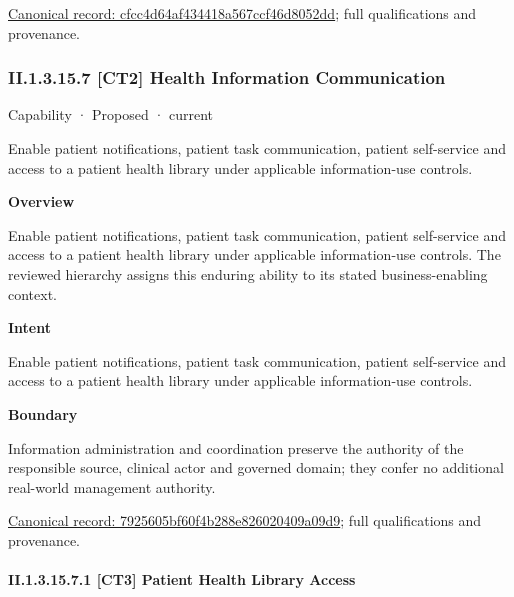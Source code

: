 {\footnotesize \href{../../../../continuum/strategy/capability/feature/cfcc4d64af434418a567ccf46d8052dd.md}{Canonical record: cfcc4d64af434418a567ccf46d8052dd}; full qualifications and provenance.}\par
\subsubsection*{II.1.3.15.7 [CT2] Health Information Communication}
\label{navigation:II.1.3.15.7}

\label{element:7925605bf60f4b288e826020409a09d9}
{\small Capability · Proposed · current}\par

Enable patient notifications, patient task communication, patient self-service and access to a patient health library under applicable information-use controls.



\textbf{Overview}



Enable patient notifications, patient task communication, patient self-service and access to a patient health library under applicable information-use controls. The reviewed hierarchy assigns this enduring ability to its stated business-enabling context.



\textbf{Intent}



Enable patient notifications, patient task communication, patient self-service and access to a patient health library under applicable information-use controls.



\textbf{Boundary}



Information administration and coordination preserve the authority of the responsible source, clinical actor and governed domain; they confer no additional real-world management authority.


{\footnotesize \href{../../../../continuum/strategy/capability/7925605bf60f4b288e826020409a09d9.md}{Canonical record: 7925605bf60f4b288e826020409a09d9}; full qualifications and provenance.}\par
\paragraph*{II.1.3.15.7.1 [CT3] Patient Health Library Access}
\label{navigation:II.1.3.15.7.1}

